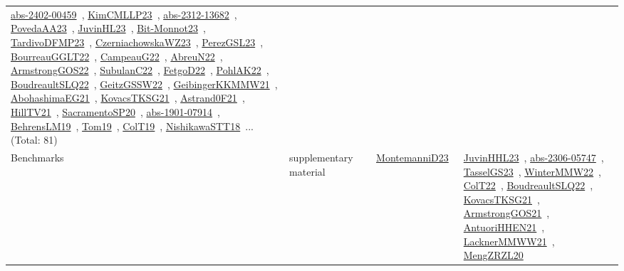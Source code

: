 {\begin{longtable}{lp{3cm}>{\raggedright\arraybackslash}p{6cm}>{\raggedright\arraybackslash}p{6cm}>{\raggedright\arraybackslash}p{8cm}}
\href{articles/abs-2402-00459.pdf}{abs-2402-00459}~\cite{abs-2402-00459}, \href{papers/KimCMLLP23.pdf}{KimCMLLP23}~\cite{KimCMLLP23}, \href{articles/abs-2312-13682.pdf}{abs-2312-13682}~\cite{abs-2312-13682}, \href{papers/PovedaAA23.pdf}{PovedaAA23}~\cite{PovedaAA23}, \href{papers/JuvinHL23.pdf}{JuvinHL23}~\cite{JuvinHL23}, \href{papers/Bit-Monnot23.pdf}{Bit-Monnot23}~\cite{Bit-Monnot23}, \href{papers/TardivoDFMP23.pdf}{TardivoDFMP23}~\cite{TardivoDFMP23}, \href{articles/CzerniachowskaWZ23.pdf}{CzerniachowskaWZ23}~\cite{CzerniachowskaWZ23}, \href{papers/PerezGSL23.pdf}{PerezGSL23}~\cite{PerezGSL23}, \href{articles/BourreauGGLT22.pdf}{BourreauGGLT22}~\cite{BourreauGGLT22}, \href{articles/CampeauG22.pdf}{CampeauG22}~\cite{CampeauG22}, \href{articles/AbreuN22.pdf}{AbreuN22}~\cite{AbreuN22}, \href{papers/ArmstrongGOS22.pdf}{ArmstrongGOS22}~\cite{ArmstrongGOS22}, \href{articles/SubulanC22.pdf}{SubulanC22}~\cite{SubulanC22}, \href{articles/FetgoD22.pdf}{FetgoD22}~\cite{FetgoD22}, \href{articles/PohlAK22.pdf}{PohlAK22}~\cite{PohlAK22}, \href{papers/BoudreaultSLQ22.pdf}{BoudreaultSLQ22}~\cite{BoudreaultSLQ22}, \href{papers/GeitzGSSW22.pdf}{GeitzGSSW22}~\cite{GeitzGSSW22}, \href{papers/GeibingerKKMMW21.pdf}{GeibingerKKMMW21}~\cite{GeibingerKKMMW21}, \href{articles/AbohashimaEG21.pdf}{AbohashimaEG21}~\cite{AbohashimaEG21}, \href{papers/KovacsTKSG21.pdf}{KovacsTKSG21}~\cite{KovacsTKSG21}, \href{papers/Astrand0F21.pdf}{Astrand0F21}~\cite{Astrand0F21}, \href{papers/HillTV21.pdf}{HillTV21}~\cite{HillTV21}, \href{articles/SacramentoSP20.pdf}{SacramentoSP20}~\cite{SacramentoSP20}, \href{articles/abs-1901-07914.pdf}{abs-1901-07914}~\cite{abs-1901-07914}, \href{papers/BehrensLM19.pdf}{BehrensLM19}~\cite{BehrensLM19}, \href{papers/Tom19.pdf}{Tom19}~\cite{Tom19}, \href{papers/ColT19.pdf}{ColT19}~\cite{ColT19}, \href{papers/NishikawaSTT18.pdf}{NishikawaSTT18}~\cite{NishikawaSTT18}... (Total: 81)\\
Benchmarks & supplementary material &  & \href{articles/MontemanniD23.pdf}{MontemanniD23}~\cite{MontemanniD23} & \href{papers/JuvinHHL23.pdf}{JuvinHHL23}~\cite{JuvinHHL23}, \href{articles/abs-2306-05747.pdf}{abs-2306-05747}~\cite{abs-2306-05747}, \href{papers/TasselGS23.pdf}{TasselGS23}~\cite{TasselGS23}, \href{papers/WinterMMW22.pdf}{WinterMMW22}~\cite{WinterMMW22}, \href{articles/ColT22.pdf}{ColT22}~\cite{ColT22}, \href{papers/BoudreaultSLQ22.pdf}{BoudreaultSLQ22}~\cite{BoudreaultSLQ22}, \href{papers/KovacsTKSG21.pdf}{KovacsTKSG21}~\cite{KovacsTKSG21}, \href{papers/ArmstrongGOS21.pdf}{ArmstrongGOS21}~\cite{ArmstrongGOS21}, \href{papers/AntuoriHHEN21.pdf}{AntuoriHHEN21}~\cite{AntuoriHHEN21}, \href{papers/LacknerMMWW21.pdf}{LacknerMMWW21}~\cite{LacknerMMWW21}, \href{articles/MengZRZL20.pdf}{MengZRZL20}~\cite{MengZRZL20}\\

\end{longtable}}
